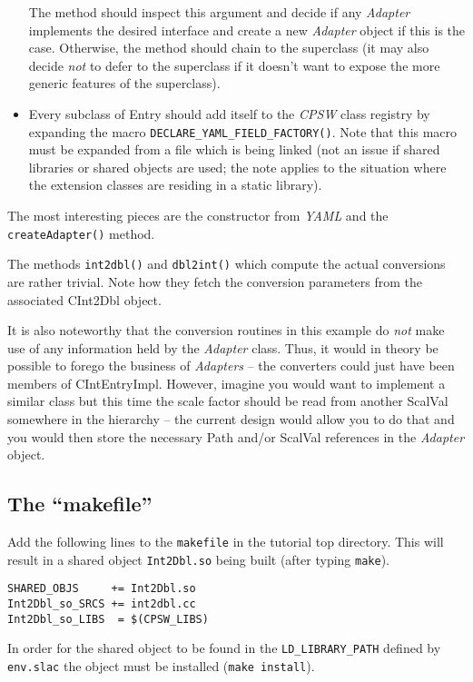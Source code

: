 \documentclass[10pt]{article}
\newcommand{\ita}[1]{\emph{#1}}
\newcommand{\cpsw}      {\ita {CPSW}}
\newcommand{\yaml}      {\ita {YAML}}
\newcommand{\Path}      {{Path}}
\newcommand{\cod}[1] {{\tt#1}}
\begin{document}
\begin{itemize}
      The method should inspect this argument and decide if any {\em Adapter}
      implements the desired interface and create a new {\em Adapter} object if this
      is the case. Otherwise, the method should chain to the superclass (it may also
      decide {\em not} to defer to the superclass if it doesn't want to expose the
      more generic features of the superclass).
\item Every subclass of Entry should add itself to the \cpsw{} class registry by
      expanding the macro \cod{DECLARE\_YAML\_FIELD\_FACTORY()}. Note that this
      macro must be expanded from a file which is being linked (not an issue if
      shared libraries or shared objects are used; the note applies to the situation
      where the extension classes are residing in a static library).
\end{itemize}
The most interesting pieces are the constructor from \yaml{} and the \cod{createAdapter()}
method.

The methods \cod{int2dbl()} and \cod{dbl2int()} which compute the actual conversions
are rather trivial.
Note how they fetch the conversion parameters from the associated CInt2Dbl object.

It is also noteworthy that the conversion routines in this example do {\em not} make
use of any information held by the {\em Adapter} class. Thus, it would in theory be
possible to forego the business of {\em Adapters} -- the converters could just have
been members of CIntEntryImpl. However, imagine you would want to implement a similar
class but this time the scale factor should be read from another ScalVal somewhere in
the hierarchy -- the current design would allow you to do that and you would then
store the necessary \Path{} and/or ScalVal references in the {\em Adapter} object.

\subsection{The ``makefile''}
Add the following lines to the \cod{makefile} in the tutorial top directory. This
will result in a shared object \cod{Int2Dbl.so} being built (after typing \cod{make}). 
\begin{verbatim}
SHARED_OBJS     += Int2Dbl.so
Int2Dbl_so_SRCS += int2dbl.cc
Int2Dbl_so_LIBS  = $(CPSW_LIBS)
\end{verbatim}
In order for the shared object to be found in the \cod{LD\_LIBRARY\_PATH} defined
by \cod{env.slac} the object must be installed (\cod{make install}).
\end{document}
